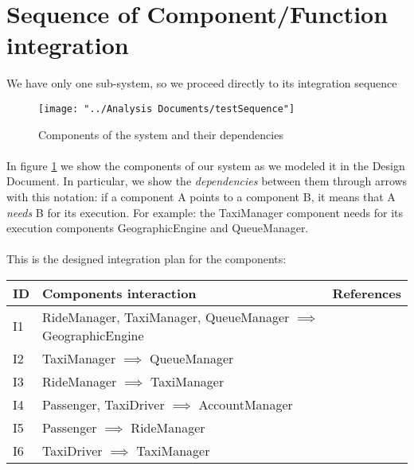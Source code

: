 \section{Sequence of Component/Function integration}
We have only one sub-system, so we proceed directly to its integration sequence
\begin{figure}[H]
	\centering
	\texttt{[image: "../Analysis Documents/testSequence"]}
	\caption{Components of the system and their dependencies}
	\label{fig:components}
\end{figure}
\paragraph{}In figure \ref{fig:components} we show the components of our system as we modeled it in the Design Document. In particular, we show the \textit{dependencies} between them through arrows with this notation: if a component A points to a component B, it means that A \textit{needs} B for its execution. For example: the TaxiManager component needs for its execution components GeographicEngine and QueueManager.

\paragraph{} This is the designed integration plan for the components:
\begin{center}
	\begin{tabular}{ l | l | l }
	\textbf{ID} & \textbf{Components interaction} & References \\ \hline
	I1 \label{I1} & RideManager, TaxiManager, QueueManager $\implies$ GeographicEngine & \\ \hline
	I2 \label{I2} & TaxiManager $\implies$ QueueManager & \\ \hline
	I3 \label{I3} & RideManager $\implies$ TaxiManager & \\ \hline
	I4 \label{I4} & Passenger, TaxiDriver $\implies$ AccountManager & \\ \hline
	I5 \label{I5} & Passenger $\implies$ RideManager & \\ \hline
	I6 \label{I6} & TaxiDriver $\implies$ TaxiManager & \\
	\end{tabular}
\end{center}
%
%
